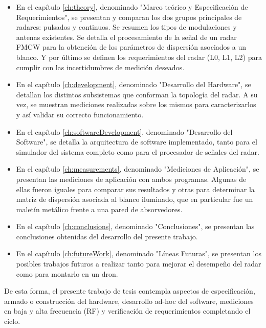 \begin{itemize}
	\item En el capítulo \ref{ch:theory}, denominado "Marco teórico y Especificación de Requerimientos", se presentan y comparan los dos grupos principales de radares: pulsados y continuos. Se resumen los tipos de modulaciones y antenas existentes. Se detalla el procesamiento de la señal de un radar FMCW para la obtención de los parámetros de dispersión asociados a un blanco. Y por último se definen los requerimientos del radar (L0, L1, L2) para cumplir con las incertidumbres de medición deseados.

    \item En el capítulo \ref{ch:development}, denominado "Desarrollo del Hardware", se detallan los distintos subsistemas que conforman la topología del radar. A su vez, se muestran mediciones realizadas sobre los mismos para caracterizarlos y así validar su correcto funcionamiento.

    \item En el capítulo \ref{ch:softwareDevelopment}, denominado "Desarrollo del Software", se detalla la arquitectura de software implementado, tanto para el simulador del sistema completo como para el procesador de señales del radar.

    \item En el capítulo \ref{ch:measurements}, denominado "Mediciones de Aplicación", se presentan las mediciones de aplicación con ambos programas. Algunas de ellas fueron iguales para comparar sus resultados y otras para determinar la matriz de dispersión asociada al blanco iluminado, que en particular fue un maletín metálico frente a una pared de absorvedores.

    \item En el capítulo \ref{ch:conclusions}, denominado "Conclusiones", se presentan las conclusiones obtenidas del desarrollo del presente trabajo.

    \item En el capítulo \ref{ch:futureWork}, denominado "Líneas Futuras", se presentan los posibles trabajos futuros a realizar tanto para mejorar el desempeño del radar como para montarlo en un dron.
\end{itemize}

De esta forma, el presente trabajo de tesis contempla aspectos de especificación, armado o construcción del hardware, desarrollo ad-hoc del software, mediciones en baja y alta frecuencia (RF) y verificación de requerimientos completando el ciclo.
